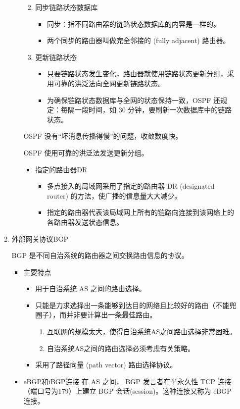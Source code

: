 \documentclass[11pt]{article}
\begin{document}
\begin{enumerate}
\begin{enumerate}
\begin{enumerate}
\begin{enumerate}
\begin{itemize}
\end{itemize}
\item 同步链路状态数据库
\begin{itemize}
\item 同步：指不同路由器的链路状态数据库的内容是一样的。
\item 两个同步的路由器叫做完全邻接的 (fully adjacent) 路由器。
\end{itemize}
\item 更新链路状态
\begin{itemize}
\item 只要链路状态发生变化，路由器就使用链路状态更新分组，采用可靠的洪泛法向全网更新链路状态。
\item 为确保链路状态数据库与全网的状态保持一致，OSPF 还规定：每隔一段时间，如 30 分钟，要刷新一次数据库中的链路状态。
\end{itemize}
\end{enumerate}

OSPF 没有“坏消息传播得慢”的问题，收敛数度快。

OSPF 使用可靠的洪泛法发送更新分组。

\begin{itemize}
\item 指定的路由器DR
\begin{itemize}
\item 多点接入的局域网采用了指定的路由器 DR (designated router) 的方法，使广播的信息量大大减少。
\item 指定的路由器代表该局域网上所有的链路向连接到该网络上的各路由器发送状态信息。
\end{itemize}
\end{itemize}
\end{enumerate}
\item 外部网关协议BGP
\label{sec:orgd94cd6c}

BGP 是不同自治系统的路由器之间交换路由信息的协议。 

\begin{itemize}
\item 主要特点
\begin{itemize}
\item 用于自治系统 AS 之间的路由选择。
\item 只能是力求选择出一条能够到达目的网络且比较好的路由（不能兜圈子），而并非要计算出一条最佳路由。
\begin{enumerate}
\item 互联网的规模太大，使得自治系统AS之间路由选择非常困难。
\item 自治系统AS之间的路由选择必须考虑有关策略。
\end{enumerate}
\item 采用了路径向量 (path vector) 路由选择协议。
\end{itemize}
\item eBGP和iBGP连接
在 AS 之间， BGP 发言者在半永久性 TCP 连接（端口号为179）上建立 BGP 会话(session)。这种连接又称为 eBGP 连接。


\end{itemize}
\end{enumerate}
\end{enumerate}
\end{document}

